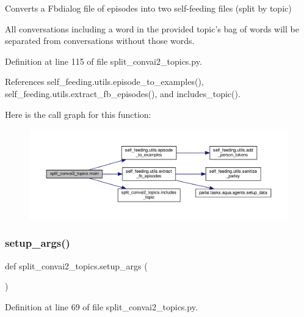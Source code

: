 \begin{DoxyVerb}Converts a Fbdialog file of episodes into two self-feeding files (split by topic)

All conversations including a word in the provided topic's bag of words will be
separated from conversations without those words.
\end{DoxyVerb}
 

Definition at line 115 of file split\+\_\+convai2\+\_\+topics.\+py.



References self\+\_\+feeding.\+utils.\+episode\+\_\+to\+\_\+examples(), self\+\_\+feeding.\+utils.\+extract\+\_\+fb\+\_\+episodes(), and includes\+\_\+topic().

Here is the call graph for this function\+:
\nopagebreak
\begin{figure}[H]
\begin{center}
\leavevmode
\includegraphics[width=350pt]{namespacesplit__convai2__topics_a4477eb52fdcb7e5f0da1639ecd493130_cgraph}
\end{center}
\end{figure}
\mbox{\label{namespacesplit__convai2__topics_a94fe060c5f31bc5a5a8b33c2a28f50f8}} 
\subsubsection{\texorpdfstring{setup\+\_\+args()}{setup\_args()}}
{\footnotesize\ttfamily def split\+\_\+convai2\+\_\+topics.\+setup\+\_\+args (\begin{DoxyParamCaption}{ }\end{DoxyParamCaption})}



Definition at line 69 of file split\+\_\+convai2\+\_\+topics.\+py.



